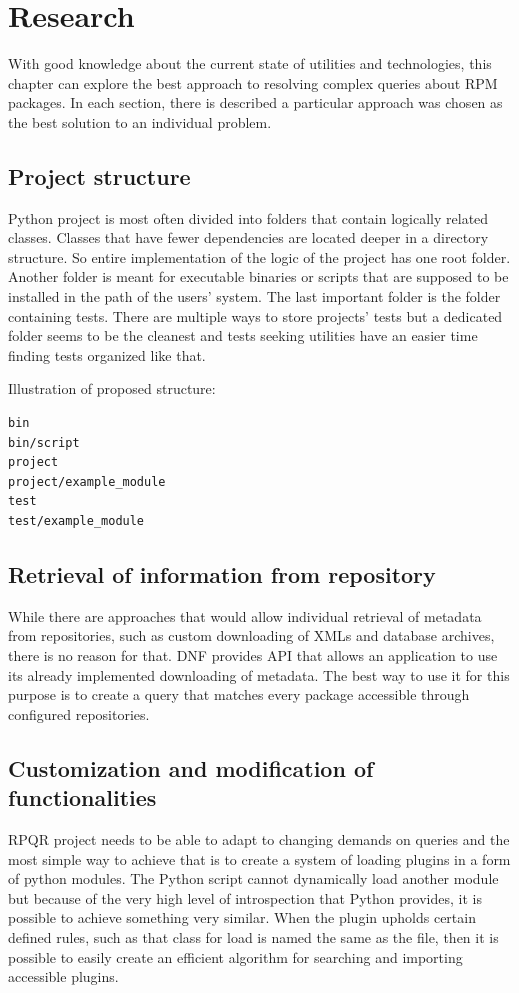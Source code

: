 \chapter{Research}
With good knowledge about the current state of utilities and technologies, this chapter can explore
the best approach to resolving complex queries about RPM packages. In each section,
there is described a particular approach was chosen as the best solution to an individual problem.

\section{Project structure}
Python project is most often divided into folders that contain logically related classes.
Classes that have fewer dependencies are located deeper in a directory structure. So entire
implementation of the logic of the project has one root folder. Another folder is meant for executable
binaries or scripts that are supposed to be installed in the path of the users' system. The last important
folder is the folder containing tests. There are multiple ways to store projects' tests but a dedicated folder
seems to be the cleanest and tests seeking utilities have an easier time finding tests organized 
like that.

Illustration of proposed structure:

\begin{lstlisting}
bin
bin/script
project
project/example_module
test
test/example_module
\end{lstlisting}

\newpage

\section{Retrieval of information from repository}
While there are approaches that would allow individual retrieval of metadata from repositories,
such as custom downloading of XMLs and database archives, there is no reason for that. DNF provides
API that allows an application to use its already implemented downloading of metadata.
The best way to use it for this purpose is to create a query that matches every package
accessible through configured repositories.

\section{Customization and modification of functionalities}
RPQR project needs to be able to adapt to changing demands on queries and the most simple way to
achieve that is to create a system of loading plugins in a form of python modules. The Python script cannot dynamically load another module but because of the very
high level of introspection that Python provides, it is possible to achieve something very similar.
When the plugin upholds certain defined rules, such as that class for load is named the same as the file,
then it is possible to easily create an efficient algorithm for searching and importing accessible
plugins.

